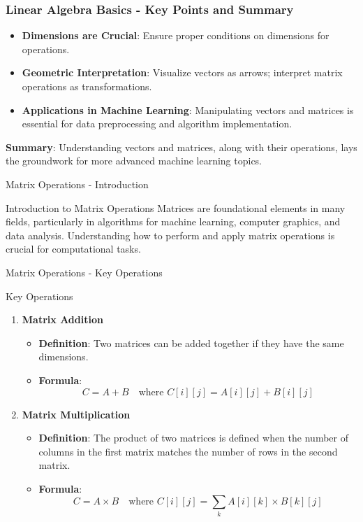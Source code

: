 \documentclass[aspectratio=169]{beamer}
\begin{document}
\begin{frame}[fragile]
    \frametitle{Linear Algebra Basics - Key Points and Summary}
    \begin{itemize}
        \item \textbf{Dimensions are Crucial}: Ensure proper conditions on dimensions for operations.
        \item \textbf{Geometric Interpretation}: Visualize vectors as arrows; interpret matrix operations as transformations.
        \item \textbf{Applications in Machine Learning}: Manipulating vectors and matrices is essential for data preprocessing and algorithm implementation.
    \end{itemize}
    
    \textbf{Summary}: Understanding vectors and matrices, along with their operations, lays the groundwork for more advanced machine learning topics.
\end{frame}

\begin{frame}[fragile]{Matrix Operations - Introduction}
    \begin{block}{Introduction to Matrix Operations}
        Matrices are foundational elements in many fields, particularly in algorithms for machine learning, computer graphics, and data analysis. 
        Understanding how to perform and apply matrix operations is crucial for computational tasks.
    \end{block}
\end{frame}

\begin{frame}[fragile]{Matrix Operations - Key Operations}
    \begin{block}{Key Operations}
        \begin{enumerate}
            \item \textbf{Matrix Addition}
            \begin{itemize}
                \item \textbf{Definition}: Two matrices can be added together if they have the same dimensions.
                \item \textbf{Formula}: 
                \[
                C = A + B \quad \text{where } C[i][j] = A[i][j] + B[i][j]
                \]
            \end{itemize}
            
            \item \textbf{Matrix Multiplication}
            \begin{itemize}
                \item \textbf{Definition}: The product of two matrices is defined when the number of columns in the first matrix matches the number of rows in the second matrix.
                \item \textbf{Formula}: 
                \[
                C = A \times B \quad \text{where } C[i][j] = \sum_{k} A[i][k] \times B[k][j]
                \]
            \end{itemize}
        \end{enumerate}
    \end{block}
\end{frame}
\end{document}
